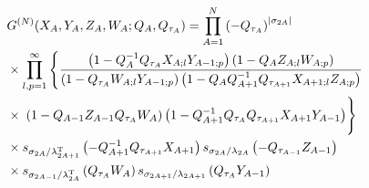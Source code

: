 \documentclass[main.tex]{subfiles}
\begin{document}
\begin{equation}
\begin{aligned}
&G^{(N)}(X_A,Y_A,Z_A,W_A;Q_A,Q_{\tau_A})=\prod_{A=1}^N\left(-Q_{\tau_A}\right)^{|\sigma_{2A}|}\\
&\times\prod_{l,p=1}^{\infty}\left\{\frac{\left(1-Q^{-1}_{A}Q_{\tau_{A}}X_{A;l}Y_{A-1;p}\right)\left(1-Q_{A}Z_{A;l}W_{A;p}\right)}{\left(1-Q_{\tau_{A}}W_{A;l}Y_{A-1;p}\right)\left(1-Q_{A}Q^{-1}_{A+1}Q_{\tau_{A+1}}X_{A+1;l}Z_{A;p}\right)}\right.\\
&\times\left.\vphantom{\frac{\left(1-Q^{-1}_{A}Q_{\tau_{A}}X_{A;l}Y_{A-1;p}\right)\left(1-Q_{A}Z_{A;l}W_{A;p}\right)}{\left(1-Q_{\tau_{A}}W_{A;l}Y_{A-1;p}\right)\left(1-Q_{A}Q^{-1}_{A+1}Q_{\tau_{A+1}}X_{A+1;l}Z_{A;p}\right)}}\left(1-Q_{A-1}Z_{A-1}Q_{\tau_A}W_A\right)\left(1-Q_{A+1}^{-1}Q_{\tau_A}Q_{\tau_{A+1}}X_{A+1}Y_{A-1}\right)\right\}\\
&\times s_{\sigma_{2A}/\lambda_{2A+1}^{\trans}}\left(-Q_{A+1}^{-1}Q_{\tau_{A+1}}X_{A+1}\right)s_{\sigma_{2A}/\lambda_{2A}}\left(-Q_{\tau_{A-1}}Z_{A-1}\right)\\
& \times s_{\sigma_{2A-1}/\lambda_{2A}^{\trans}}\left(Q_{\tau_A}W_{A}\right)s_{\sigma_{2A+1}/\lambda_{2A+1}}\left(Q_{\tau_A}Y_{A-1}\right)
\end{aligned}
\end{equation}
\end{document}
